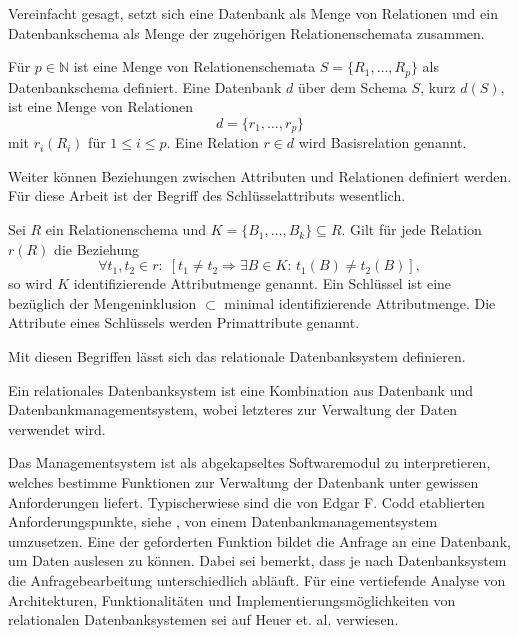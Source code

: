 Vereinfacht gesagt, setzt sich eine Datenbank als Menge von Relationen und ein Datenbankschema als Menge der zugehörigen Relationenschemata zusammen.

\begin{defi}
    Für $p \in \mathbb{N}$ ist eine Menge von Relationenschemata $S=\{R_1, \ldots, R_p\}$ als Datenbankschema definiert. Eine Datenbank $d$ über dem Schema $S$, kurz $d(S)$, ist eine Menge von Relationen
    \begin{equation*}
        d=\{r_1, \ldots, r_p \}
    \end{equation*}
    mit $r_i(R_i)$ für $1 \leq i \leq p$. Eine Relation $r \in d$ wird Basisrelation genannt.
\end{defi}

Weiter können Beziehungen zwischen Attributen und Relationen definiert werden. Für diese Arbeit ist der Begriff des Schlüsselattributs wesentlich.

\begin{defi}[Schlüssel]
    \label{def:key}
    Sei $R$ ein Relationenschema und $K=\{B_1, \ldots, B_k\} \subseteq R$. Gilt für jede Relation $r(R)$ die Beziehung
    \begin{equation*}
         \forall t_1, t_2 \in r: \; [ t_1 \neq t_2 \Rightarrow \exists B \in K: \, t_1(B) \neq t_2(B)],
    \end{equation*}
    so wird $K$ identifizierende Attributmenge genannt. Ein Schlüssel ist eine bezüglich der Mengeninklusion $\subset$ minimal identifizierende Attributmenge. Die Attribute eines Schlüssels werden Primattribute genannt.
\end{defi}

Mit diesen Begriffen lässt sich das relationale Datenbanksystem definieren.

\begin{defi}
    Ein relationales Datenbanksystem ist eine Kombination aus Datenbank und Datenbankmanagementsystem, wobei letzteres zur Verwaltung der Daten verwendet wird.
\end{defi}

Das Managementsystem ist als abgekapseltes Softwaremodul zu interpretieren, welches bestimme Funktionen zur Verwaltung der Datenbank unter gewissen Anforderungen liefert. Typischerwiese sind die von Edgar F. Codd etablierten Anforderungspunkte, siehe \cite{DBLP:books/daglib/0044627}, von einem Datenbankmanagementsystem umzusetzen. Eine der geforderten Funktion bildet die Anfrage an eine Datenbank, um Daten auslesen zu können. Dabei sei bemerkt, dass je nach Datenbanksystem die Anfragebearbeitung unterschiedlich abläuft. Für eine vertiefende Analyse von Architekturen, Funktionalitäten und Implementierungsmöglichkeiten von relationalen Datenbanksystemen sei auf Heuer et. al.\cite{DBLP:books/mitp/HSS19, DBLP:books/daglib/0044627} verwiesen. 

